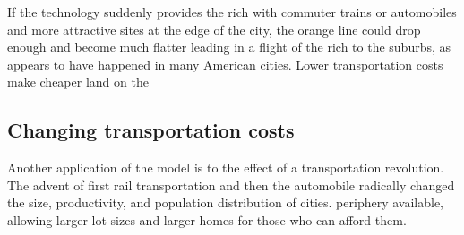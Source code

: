  If the technology suddenly provides the rich with commuter trains or automobiles and more attractive sites at the edge of the city, the orange line could drop enough  and become much flatter leading in a flight of the rich to the suburbs, as appears to have happened in many American cities. Lower transportation costs make cheaper land on the 

\subsection {Changing transportation costs}

Another application of the model is to the effect of a transportation revolution. The advent of first rail transportation and then the automobile radically changed the size, productivity, and population distribution of cities.
periphery available, allowing larger lot sizes and larger homes for those who can afford them.

